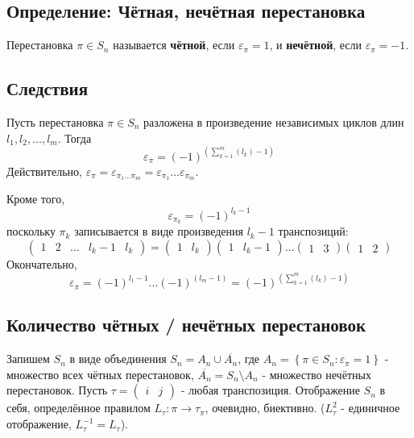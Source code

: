 \documentclass{article}
\begin{document}
\subsection{Определение: Чётная, нечётная перестановка}
Перестановка $\pi \in S_n$ называется \textbf{чётной}, если $\varepsilon_\pi = 1$, и \textbf{нечётной}, если $\varepsilon_\pi = -1$.

\subsection{Следствия}
Пусть перестановка $\pi \in S_n$ разложена в произведение независимых циклов длин $l_1, l_2, \dots, l_m$. Тогда \[\varepsilon_\pi = (-1)^{\left(\sum_{k = 1}^{m}(l_k) - 1\right)}\]
Действительно, $\varepsilon_\pi = \varepsilon_{\pi_1\dots\pi_m} = \varepsilon_{\pi_1}\dots\varepsilon_{\pi_m}$.

Кроме того, \[\varepsilon_{\pi_k} = (-1)^{l_k-1}\] поскольку $\pi_k$ записывается в виде произведения $l_k-1$ транспозиций:
\[(\begin{matrix}1&2&\dots & {l_k-1} & {l_k}\end{matrix}) = (\begin{matrix}1 & {l_k}\end{matrix})(\begin{matrix}1 & {l_k-1}\end{matrix})\dots(\begin{matrix}1 & 3\end{matrix})(\begin{matrix}1 & 2\end{matrix})\]
Окончательно,
\[\varepsilon_\pi = (-1)^{l_1-1}\dots(-1)^(l_m-1) = (-1)^{\left(\sum_{k = 1}^{m}(l_k) - 1\right)}\]

\subsection{Количество чётных / нечётных перестановок}
Запишем $S_n$ в виде объединения $S_n = A_n \cup \overline{A_n}$, где $A_n = \left\{\pi \in S_n : \varepsilon_\pi = 1\right\}$ - множество всех чётных перестановок, $\overline{A_n} = S_n \setminus A_n$ - множество нечётных перестановок. Пусть $\tau = (\begin{matrix}i & j\end{matrix})$ - любая транспозиция. Отображение $S_n$ в себя, определённое правилом $L_\tau : \pi \rightarrow \tau_\pi$, очевидно, биективно. ($L_\tau^2$ - единичное отображение, $L_\tau^{-1} = L_\tau$).
\end{document}
